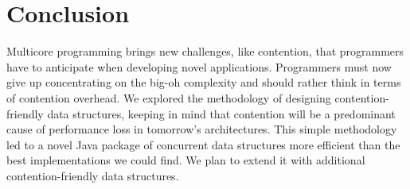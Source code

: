 \section{Conclusion}\label{sec:conclusion}

Multicore programming brings new challenges, like contention, that programmers have to anticipate
when developing novel applications.
Programmers must now give up concentrating on the big-oh complexity and should
rather think in terms of contention overhead.
We explored the methodology of designing contention-friendly data structures, keeping in mind that contention will be a predominant cause of performance loss in tomorrow's architectures.
This simple methodology led to a novel Java package of concurrent data structures more efficient than the best implementations we could find. We plan to extend it with additional contention-friendly data structures.

%

% 
% 
% 
% 
% 
% 
% 
% 
% 

